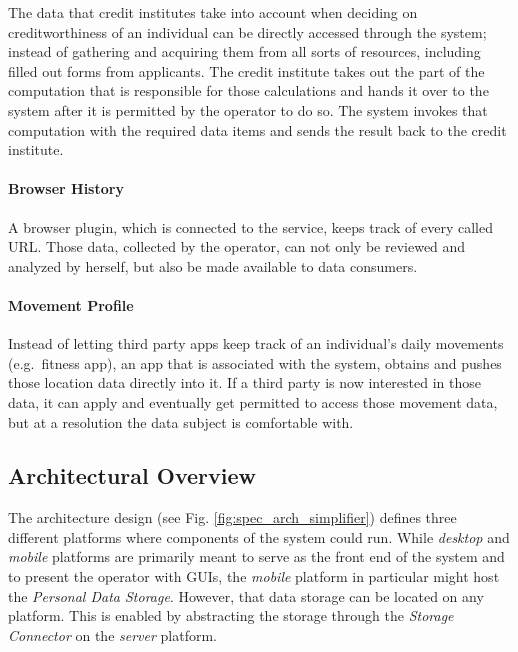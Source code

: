 \documentclass[12pt,english,a4paper,titlepage,cleardoublepage=empty,dottedtoc]{report}
\begin{document}
The data that credit institutes take into account when deciding on
creditworthiness of an individual can be directly accessed through the
system; instead of gathering and acquiring them from all sorts of
resources, including filled out forms from applicants. The credit
institute takes out the part of the computation that is responsible for
those calculations and hands it over to the system after it is permitted
by the operator to do so. The system invokes that computation with the
required data items and sends the result back to the credit institute.

\paragraph{Browser History}\label{browser-history}

A browser plugin, which is connected to the service, keeps track of
every called URL. Those data, collected by the operator, can not only be
reviewed and analyzed by herself, but also be made available to data
consumers.

\paragraph{Movement Profile}\label{movement-profile}

Instead of letting third party apps keep track of an individual's daily
movements (e.g.~fitness app), an app that is associated with the system,
obtains and pushes those location data directly into it. If a third
party is now interested in those data, it can apply and eventually get
permitted to access those movement data, but at a resolution the data
subject is comfortable with.

\subsection{Architectural Overview}\label{architectural-overview}

The architecture design (see Fig. \ref{fig:spec_arch_simplifier})
defines three different platforms where components of the system could
run. While \emph{desktop} and \emph{mobile} platforms are primarily
meant to serve as the front end of the system and to present the
operator with GUIs, the \emph{mobile} platform in particular might host
the \emph{Personal Data Storage}. However, that data storage can be
located on any platform. This is enabled by abstracting the storage
through the \emph{Storage Connector} on the \emph{server} platform.
\end{document}
